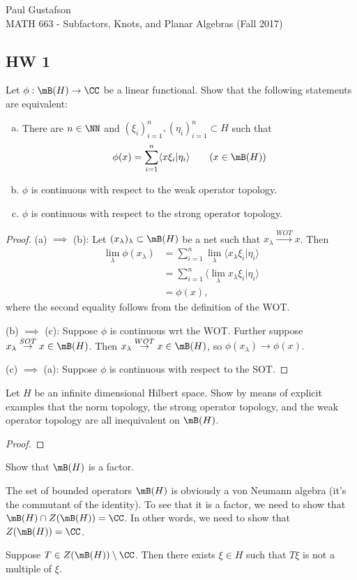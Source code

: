 \documentclass{article}
\begin{document}
\noindent Paul Gustafson\\
\noindent MATH 663 - Subfactors, Knots, and Planar Algebras (Fall 2017)

\subsection*{HW 1}
 Let $\phi: \mB(H) \to \CC$ be a linear functional. Show that the following statements are equivalent:
\begin{enumerate}[(a)]
 \item There are $n \in \NN$ and $(\xi_i)_{i=1}^n, (\eta_i)_{i=1}^n \subset H$ such that
  $$ \phi(x) = \sum_{i=1}^n \langle x \xi_i | \eta_i \rangle \qquad (x \in \mB(H))$$
 \item $\phi$ is continuous with respect to the weak operator topology.
 \item $\phi$ is continuous with respect to the strong operator topology.
\end{enumerate}
\begin{proof}
  (a) $\implies$ (b):  Let $(x_\lambda)_\lambda \subset \mB(H)$ be a net such that $x_\lambda \overset{WOT}{\to} x$. Then
  \begin{align*}
  \lim_\lambda \phi(x_\lambda) & =  \sum_{i=1}^n \lim_\lambda \langle x_\lambda \xi_i | \eta_i \rangle \\
  & = \sum_{i=1}^n \langle \lim_\lambda x_\lambda \xi_i | \eta_i \rangle \\
  & = \phi(x),
  \end{align*}
  where the second equality follows from the definition of the WOT.
  
  (b) $\implies$ (c): Suppose $\phi$ is continuous wrt the WOT. Further suppose $x_\lambda \overset{SOT}{\to} x \in \mB(H)$.
  Then $x_\lambda \overset{WOT}{\to} x \in \mB(H)$, so $\phi(x_\lambda) \to \phi(x)$.

  (c) $\implies$ (a):  Suppose $\phi$ is continuous with respect to the SOT.  
  
  
\end{proof}

 Let $H$ be an infinite dimensional Hilbert space. Show by means of explicit examples that the norm topology, the strong operator topology, and the weak operator topology are all inequivalent on $\mB(H)$.
\begin{proof}
  
\end{proof}

 Show that $\mB(H)$ is a factor.
\begin{frame}
  The set of bounded operators  $\mB(H)$ is obviously a von Neumann algebra (it's the commutant of the identity).  To see that it is a factor, we need to show that $\mB(H) \cap Z(\mB(H)) = \CC$.  In other words, we need to show that $Z(\mB(H)) = \CC$.

  Suppose $T \in Z(\mB(H)) \setminus \CC$.  Then there exists $\xi \in H$ such that $T \xi$ is not a multiple of $\xi$.  %
\end{frame}
\end{document}
